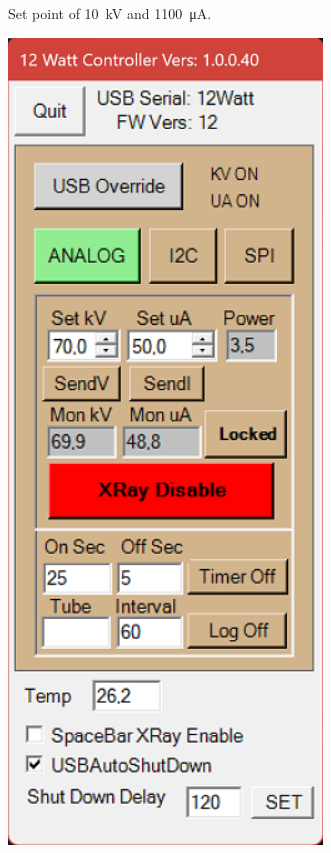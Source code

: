 \begin{figure}
\begin{subfigure}{.3\textwidth}
            \caption[Set point of \qty{10}{kV} and \qty{1100}{\micro\ampere}]{Set point of \qty{10}{kV} and \qty{1100}{\micro\ampere}.}%
            \label{subfig:12WattController 10kV}
        \end{subfigure}
        \hspace{10mm}
        \begin{subfigure}{.3\textwidth}
            \centering
            \includegraphics[width=\textwidth]{pictures/12WattController_70kV_10uA.png}

\end{subfigure}
\end{figure}
